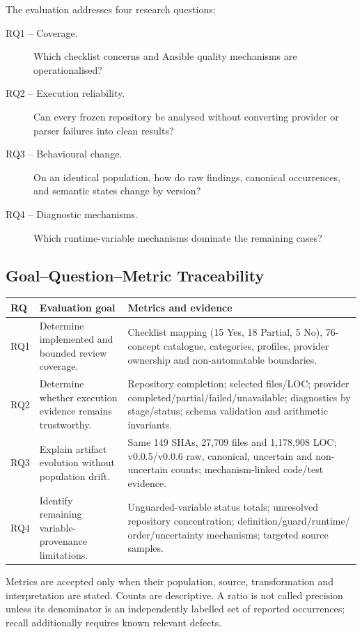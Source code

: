 The evaluation addresses four research questions:
\begin{description}
  \item[RQ1 -- Coverage.] Which checklist concerns and Ansible quality
    mechanisms are operationalised?
  \item[RQ2 -- Execution reliability.] Can every frozen repository be analysed
    without converting provider or parser failures into clean results?
  \item[RQ3 -- Behavioural change.] On an identical population, how do raw
    findings, canonical occurrences, and semantic states change by version?
  \item[RQ4 -- Diagnostic mechanisms.] Which runtime-variable mechanisms
    dominate the remaining  cases?
\end{description}

\subsection{Goal--Question--Metric Traceability}
\begin{longtable}{p{1.2cm}p{4.5cm}p{8.2cm}}
\toprule RQ & Evaluation goal & Metrics and evidence \\ \midrule\endhead
RQ1 & Determine implemented and bounded review coverage. & Checklist mapping
(15 Yes, 18 Partial, 5 No), 76-concept catalogue, categories, profiles,
provider ownership and non-automatable boundaries. \\
RQ2 & Determine whether execution evidence remains trustworthy. & Repository
completion; selected files/LOC; provider completed/partial/failed/unavailable;
diagnostics by stage/status; schema validation and arithmetic invariants. \\
RQ3 & Explain artifact evolution without population drift. & Same 149 SHAs,
27,709 files and 1,178,908 LOC; v0.0.5/v0.0.6 raw, canonical, uncertain and
non-uncertain counts; mechanism-linked code/test evidence. \\
RQ4 & Identify remaining variable-provenance limitations. & Unguarded-variable
status totals; unresolved repository concentration; definition/guard/runtime/
order/uncertainty mechanisms; targeted source samples. \\
\bottomrule
\end{longtable}

Metrics are accepted only when their population, source, transformation and
interpretation are stated. Counts are descriptive. A ratio is not called
precision unless its denominator is an independently labelled set of reported
occurrences; recall additionally requires known relevant defects.

